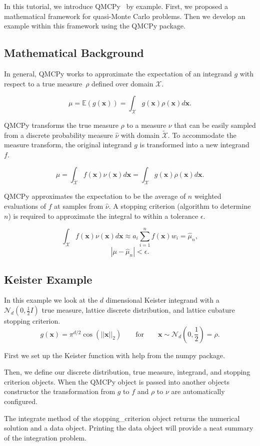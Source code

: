 In this tutorial, we introduce QMCPy~\cite{QMCPy2020a}  by example. First, we proposed a mathematical framework for quasi-Monte Carlo problems. Then we develop an example within this framework using the QMCPy package.

\subsection{Mathematical Background}
In general, QMCPy works to approximate the expectation of an integrand $g$ with respect to a true measure~$\rho$ defined over domain $\mathcal{X}$. 

$$\mu = \mathbb{E}(g(\mathbf{x})) = \int_{\mathcal{X}} g(\mathbf{x}) \rho(\mathbf{x}) d\mathbf{x}.$$

QMCPy transforms the true measure $\rho$ to a measure $\nu$ that can be easily sampled from a discrete probability measure $\hat{\nu}$ with domain $\tilde{\mathcal{X}}$. To accommodate the measure transform, the original integrand $g$ is transformed into a new integrand~$f$.

$$\mu = \int_{\tilde{\mathcal{X}}} f(\mathbf{x}) \nu(\mathbf{x}) d\mathbf{x} = \int_{\mathcal{X}} g(\mathbf{x}) \rho(\mathbf{x}) d\mathbf{x}.$$

QMCPy approximates the expectation to be the average of $n$ weighted evaluations of $f$ at samples from $\hat{\nu}$. A stopping criterion (algorithm to determine $n$) is required to approximate the integral to within a tolerance $\epsilon$. 

$$\int_{\mathcal{X}} f(\mathbf{x}) \nu(\mathbf{x}) d\mathbf{x} \approx a_i \sum_{i=1}^n f(\mathbf{x}) w_i = \hat{\mu}_n,$$
$$|\mu-\hat{\mu}_n|<\epsilon.$$

\subsection{Keister Example}
In this example we look at the $d$ dimensional Keister integrand with a $\mathcal{N}_d(0,\frac{1}{2}I)$ true measure, lattice discrete distribution, and lattice cubature stopping criterion. 
$$g(\mathbf{x}) = \pi^{d/2} \cos(||\mathbf{x}||_2) \qquad \text{for} \qquad \mathbf{x} \sim \mathcal{N}_d(0,\frac{1}{2}) = \rho.$$


First we set up the Keister function with help from the numpy package.


Then, we define our discrete distribution, true measure, integrand, and stopping criterion objects. When the QMCPy object is passed into another objects constructor the transformation from $g$ to $f$ and $\rho$ to $\nu$ are automatically configured. 


The integrate method of the stopping\_criterion object returns the numerical solution and a data object. Printing the data object will provide a neat summary of the integration problem.

